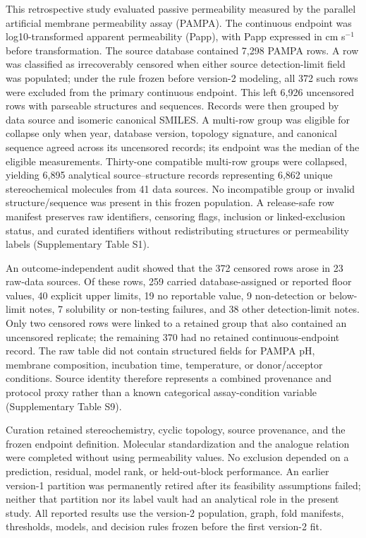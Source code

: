 \documentclass[referee,lineno,pdflatex,Numbered,sn-basic]{sn-jnl}
\begin{document}
This retrospective study evaluated passive permeability measured by the parallel artificial membrane permeability assay (PAMPA). The continuous endpoint was log10-transformed apparent permeability (Papp), with Papp expressed in cm s$^{-1}$ before transformation. The source database contained 7,298 PAMPA rows. A row was classified as irrecoverably censored when either source detection-limit field was populated; under the rule frozen before version-2 modeling, all 372 such rows were excluded from the primary continuous endpoint. This left 6,926 uncensored rows with parseable structures and sequences. Records were then grouped by data source and isomeric canonical SMILES. A multi-row group was eligible for collapse only when year, database version, topology signature, and canonical sequence agreed across its uncensored records; its endpoint was the median of the eligible measurements. Thirty-one compatible multi-row groups were collapsed, yielding 6,895 analytical source--structure records representing 6,862 unique stereochemical molecules from 41 data sources. No incompatible group or invalid structure/sequence was present in this frozen population. A release-safe row manifest preserves raw identifiers, censoring flags, inclusion or linked-exclusion status, and curated identifiers without redistributing structures or permeability labels (Supplementary Table S1).

An outcome-independent audit showed that the 372 censored rows arose in 23 raw-data sources. Of these rows, 259 carried database-assigned or reported floor values, 40 explicit upper limits, 19 no reportable value, 9 non-detection or below-limit notes, 7 solubility or non-testing failures, and 38 other detection-limit notes. Only two censored rows were linked to a retained group that also contained an uncensored replicate; the remaining 370 had no retained continuous-endpoint record. The raw table did not contain structured fields for PAMPA pH, membrane composition, incubation time, temperature, or donor/acceptor conditions. Source identity therefore represents a combined provenance and protocol proxy rather than a known categorical assay-condition variable (Supplementary Table S9).

Curation retained stereochemistry, cyclic topology, source provenance, and the frozen endpoint definition. Molecular standardization and the analogue relation were completed without using permeability values. No exclusion depended on a prediction, residual, model rank, or held-out-block performance. An earlier version-1 partition was permanently retired after its feasibility assumptions failed; neither that partition nor its label vault had an analytical role in the present study. All reported results use the version-2 population, graph, fold manifests, thresholds, models, and decision rules frozen before the first version-2 fit.
\end{document}
